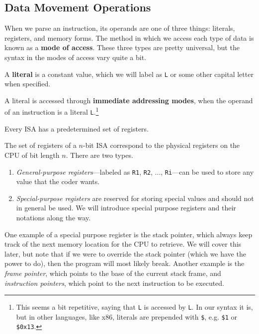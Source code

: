 \subsection{Data Movement Operations} 

  When we parse an instruction, its operands are one of three things: literals, registers, and memory forms. The method in which we access each type of data is known as a \textbf{mode of access}. These three types are pretty universal, but the syntax in the modes of access vary quite a bit. 

  \begin{definition}[Literals]
    \label{def:literals}
    A \textbf{literal} is a constant value, which we will label as \texttt{L} or some other capital letter when specified. 
  \end{definition}

  \begin{definition}
    \label{def:immediate-addressing}
    A literal is accessed through \textbf{immediate addressing modes}, when the operand of an instruction is a literal \texttt{L}.\footnote{This seems a bit repetitive, saying that \texttt{L} is accessed by \texttt{L}. In our syntax it is, but in other languages, like x86, literals are prepended with \texttt{\$}, e.g. \texttt{\$1} or \texttt{\$0x13}.} 
  \end{definition}

  Every ISA has a predetermined set of registers. 

  \begin{definition}[Registers]
    \label{def:registers}
    The set of registers of a $n$-bit ISA correspond to the physical registers on the CPU of bit length $n$. There are two types. 
    \begin{enumerate}
      \item \textit{General-purpose registers}---labeled as \texttt{R1}, \texttt{R2}, ..., \texttt{Ri}---can be used to store any value that the coder wants. 
      \item \textit{Special-purpose registers} are reserved for storing special values and should not in general be used. We will introduce special purpose registers and their notations along the way. 
    \end{enumerate}
  \end{definition}

  One example of a special purpose register is the stack pointer, which always keep track of the next memory location for the CPU to retrieve. We will cover this later, but note that if we were to override the stack pointer (which we have the power to do), then the program will most likely break. Another example is the \textit{frame pointer}, which points to the base of the current stack frame, and \textit{instruction pointers}, which point to the next instruction to be executed. 

